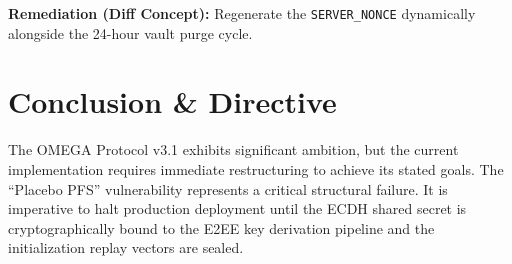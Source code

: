 \documentclass[11pt,a4paper]{article}
\begin{document}
\textbf{Remediation (Diff Concept):}
Regenerate the \texttt{SERVER\_NONCE} dynamically alongside the 24-hour vault purge cycle.

\section{Conclusion \& Directive}
The OMEGA Protocol v3.1 exhibits significant ambition, but the current implementation requires immediate restructuring to achieve its stated goals. The ``Placebo PFS'' vulnerability represents a critical structural failure. It is imperative to halt production deployment until the ECDH shared secret is cryptographically bound to the E2EE key derivation pipeline and the initialization replay vectors are sealed.
\end{document}
